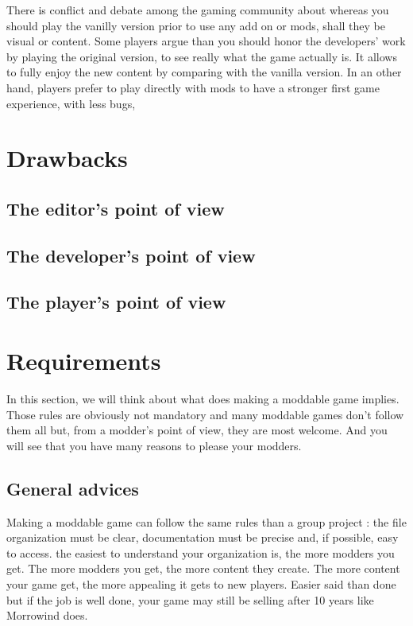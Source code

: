 \documentclass[a4paper,11pt]{article}
\begin{document}
There is conflict and debate among the gaming community about whereas you should play the vanilly version prior to use any add on or mods, shall they be visual or content. Some players argue than you should honor the developers’ work by playing the original version, to see really what the game actually is. It allows to fully enjoy the new content by comparing with the vanilla version.
In an other hand, players prefer to play directly with mods to have a stronger first game experience, with less bugs, 

\section{Drawbacks }

\subsection{The editor's point of view}

\subsection{The developer's point of view}

\subsection{The player's point of view}


\section{Requirements}

In this section, we will think about what does making a moddable game implies. Those rules are obviously not mandatory and many moddable games don’t follow them all but, from a modder’s point of view, they are most welcome. And you will see that you have many reasons to please your modders. 

\subsection{General advices}
Making a moddable game can follow the same rules than a group project : the file organization must be clear, documentation must be precise and, if possible, easy to access. 
the easiest to understand your organization is, the more modders you get. The more modders you get, the more content they create. The more content your game get, the more appealing it gets to new players. Easier said than done but if the job is well done, your game may still be selling after 10 years like Morrowind does.
\end{document}

